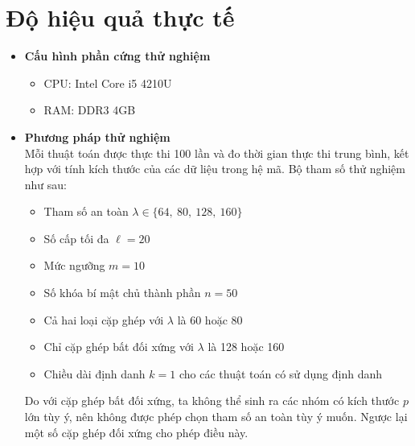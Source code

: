 \documentclass[class=report, crop=false]{standalone}
\begin{document}
	\newpage
	\section{Độ hiệu quả thực tế}
		
		\begin{itemize}
			\item[] {\sffamily\bfseries Cấu hình phần cứng thử nghiệm}
			\begin{itemize}
				\item CPU: Intel Core i5 4210U
				\item RAM: DDR3 4GB
			\end{itemize}
			\item[] {\sffamily\bfseries Phương pháp thử nghiệm} \\
			Mỗi thuật toán được thực thi 100 lần và đo thời gian thực thi trung bình, kết hợp với tính kích thước của các dữ liệu trong hệ mã. Bộ tham số thử nghiệm như sau:
			\begin{itemize}
				\item Tham số an toàn $\lambda \in \{64,\ 80,\ 128,\ 160 \}$
				\item Số cấp tối đa $\ell = 20$
				\item Mức ngưỡng $m = 10$
				\item Số khóa bí mật chủ thành phần $n = 50$
				\item Cả hai loại cặp ghép với $\lambda$ là 60 hoặc 80
				\item Chỉ cặp ghép bất đối xứng với $\lambda$ là 128 hoặc 160
				\item Chiều dài định danh $k = 1$ cho các thuật toán có sử dụng định danh
			\end{itemize}
			Do với cặp ghép bất đối xứng, ta không thể sinh ra các nhóm có kích thước $p$ lớn tùy ý, nên không được phép chọn tham số an toàn tùy ý muốn. Ngược lại một số cặp ghép đối xứng cho phép điều này.


\end{itemize}
\end{document}
